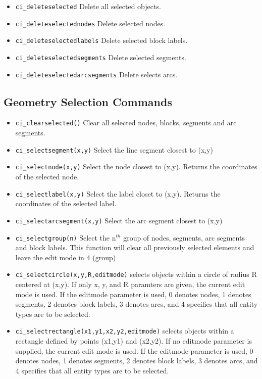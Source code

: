 \begin{itemize}
\item {\tt ci\_deleteselected} Delete all selected objects.

\item {\tt ci\_deleteselectednodes} Delete selected nodes.

\item {\tt ci\_deleteselectedlabels} Delete selected block labels.

\item {\tt ci\_deleteselectedsegments} Delete selected segments.

\item {\tt ci\_deleteselectedarcsegments} Delete selects arcs.
\end{itemize}


\subsection{Geometry Selection Commands}

\begin{itemize}
\item {\tt ci\_clearselected()} Clear all selected nodes, blocks, segments and arc
segments.

\item {\tt ci\_selectsegment(x,y)} Select the line segment closest to (x,y)

\item {\tt ci\_selectnode(x,y)} Select the node closest to (x,y).
Returns the coordinates of the selected node.

\item {\tt ci\_selectlabel(x,y)} Select the label closet to (x,y).
Returns the coordinates of the selected label.

\item {\tt ci\_selectarcsegment(x,y)} Select the arc segment closest to (x,y)

\item {\tt ci\_selectgroup(n)} Select the n$^{th}$ group of nodes, segments, arc
segments and block labels. This function will clear all previously selected
elements and leave the edit mode in 4 (group)

\item{\tt ci\_selectcircle(x,y,R,editmode)} selects objects within a circle of radius
R centered at (x,y).  If only x, y, and R paramters are given, the current
edit mode is used.  If the editmode parameter is used, 0 denotes nodes, 1 denotes segments,
2 denotes block labels, 3 denotes arcs, and 4 specifies that all entity types are to be selected.

\item{\tt ci\_selectrectangle(x1,y1,x2,y2,editmode)} selects objects within a rectangle
defined by points (x1,y1) and (x2,y2). If no editmode parameter is supplied,
the current edit mode is used.  If the editmode parameter is used, 0 denotes nodes, 1 denotes segments,
2 denotes block labels, 3 denotes arcs, and 4 specifies that all entity types are to be selected.

\end{itemize}


